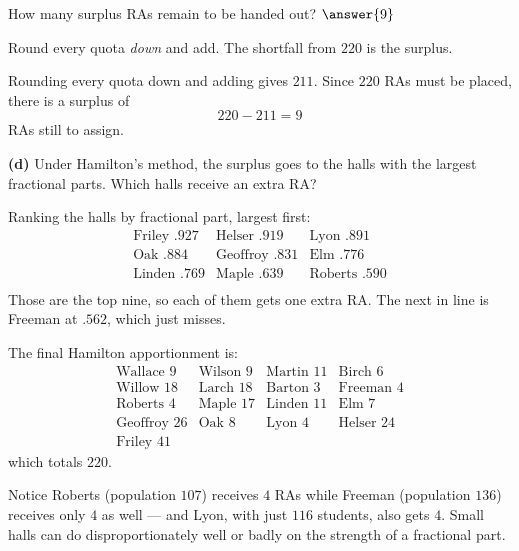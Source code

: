 \documentclass[12pt]{ximera}
\begin{document}
\begin{problem}
\begin{prompt}
\smallskip
How many surplus RAs remain to be handed out? $\answer{9}$

\begin{hint}
Round every quota \emph{down} and add. The shortfall from $220$ is the surplus.
\end{hint}

\begin{feedback}
Rounding every quota down and adding gives $211$. Since $220$ RAs must be placed, there
is a surplus of
\[ 220 - 211 = 9 \]
RAs still to assign.
\end{feedback}
\end{prompt}

\begin{prompt}
\textbf{(d)} Under Hamilton's method, the surplus goes to the halls with the largest
fractional parts. Which halls receive an extra RA?

\begin{selectAll}
\end{selectAll}

\begin{feedback}
Ranking the halls by fractional part, largest first:
\[
\begin{array}{lll}
\text{Friley } .927 & \text{Helser } .919 & \text{Lyon } .891\\
\text{Oak } .884 & \text{Geoffroy } .831 & \text{Elm } .776\\
\text{Linden } .769 & \text{Maple } .639 & \text{Roberts } .590\\
\end{array}
\]
Those are the top nine, so each of them gets one extra RA. The next in line is Freeman
at $.562$, which just misses.

The final Hamilton apportionment is:
\[
\begin{array}{llll}
\text{Wallace } 9 & \text{Wilson } 9 & \text{Martin } 11 & \text{Birch } 6\\
\text{Willow } 18 & \text{Larch } 18 & \text{Barton } 3 & \text{Freeman } 4\\
\text{Roberts } 4 & \text{Maple } 17 & \text{Linden } 11 & \text{Elm } 7\\
\text{Geoffroy } 26 & \text{Oak } 8 & \text{Lyon } 4 & \text{Helser } 24\\
\text{Friley } 41 & & &
\end{array}
\]
which totals $220$. \checkmark

Notice Roberts (population $107$) receives $4$ RAs while Freeman (population $136$)
receives only $4$ as well --- and Lyon, with just $116$ students, also gets $4$. Small
halls can do disproportionately well or badly on the strength of a fractional part.
\end{feedback}
\end{prompt}
\end{problem}
\end{document}
